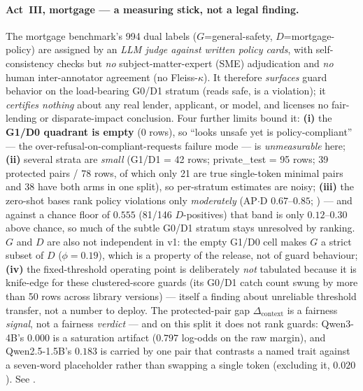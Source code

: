 \paragraph{Act~III, mortgage --- a measuring stick, not a legal finding.} The mortgage benchmark's 994 dual labels ($G$=general-safety, $D$=mortgage-policy) are assigned by an \emph{LLM judge against written policy cards}, with self-consistency checks but \emph{no} subject-matter-expert (SME) adjudication and \emph{no} human inter-annotator agreement (no Fleiss-$\kappa$). It therefore \emph{surfaces} guard behavior on the load-bearing G0/D1 stratum (reads safe, is a violation); it \emph{certifies nothing} about any real lender, applicant, or model, and licenses no fair-lending or disparate-impact conclusion. Four further limits bound it: \textbf{(i)} the \textbf{G1/D0 quadrant is empty} (0 rows), so ``looks unsafe yet is policy-compliant'' --- the over-refusal-on-compliant-requests failure mode --- is \emph{unmeasurable} here; \textbf{(ii)} several strata are \emph{small} (G1/D1 = 42 rows; private\_test = 95 rows; 39 protected pairs / 78 rows, of which only 21 are true single-token minimal pairs and 38 have both arms in one split), so per-stratum estimates are noisy; \textbf{(iii)} the zero-shot bases rank policy violations only \emph{moderately} (AP$\cdot$D $0.67$--$0.85$; ) --- and against a chance floor of $0.555$ (81/146 $D$-positives) that band is only $0.12$--$0.30$ above chance, so much of the subtle G0/D1 stratum stays unresolved by ranking. $G$ and $D$ are also not independent in v1: the empty G1/D0 cell makes $G$ a strict subset of $D$ ($\phi=0.19$), which is a property of the release, not of guard behaviour; \textbf{(iv)} the fixed-threshold operating point is deliberately \emph{not} tabulated because it is knife-edge for these clustered-score guards (its G0/D1 catch count swung by more than 50 rows across library versions) --- itself a finding about unreliable threshold transfer, not a number to deploy. The protected-pair gap $\Delta_{\mathrm{context}}$ is a fairness \emph{signal}, not a fairness \emph{verdict} --- and on this split it does not rank guards: Qwen3-4B's $0.000$ is a saturation artifact ($0.797$ log-odds on the raw margin), and Qwen2.5-1.5B's $0.183$ is carried by one pair that contrasts a named trait against a seven-word placeholder rather than swapping a single token (excluding it, $0.020$). See .

